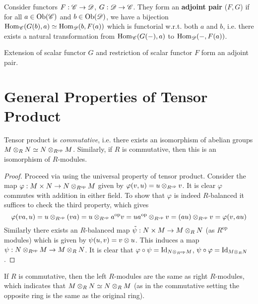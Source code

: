 \begin{definition}
    Consider functors $F: \mathscr{C} \to \mathscr{D}$, $G: \mathscr{D} \to \mathscr{C}$. They form an \textbf{adjoint pair} ($F, G$) if for all $a \in \mathrm{Ob}(\mathscr{C})$ and $b \in \mathrm{Ob}(\mathscr{D})$, we have a bijection $\mathrm{Hom}_{\mathscr{C}}(G(b), a) \simeq \mathrm{Hom}_{\mathscr{D}}(b, F(a))$ which is functorial w.r.t. both $a$ and $b$, i.e. there exists a natural transformation from $\mathrm{Hom}_{\mathscr{C}}(G(-), a)$ to $\mathrm{Hom}_{\mathscr{D}}(-, F(a))$.
\end{definition}

\begin{remark}
    Extension of scalar functor $G$ and restriction of scalar functor $F$ form an adjoint pair.
\end{remark}

\section{General Properties of Tensor Product}

\def\op{\text{op}}

\begin{proposition}
    Tensor product is \emph{commutative}, i.e. there exists an isomorphism of abelian groups $M \tensor_R N \simeq N \tensor_{R^{\op}} M$. Similarly, if $R$ is commutative, then this is an isomorphism of $R$-modules.
\end{proposition}

\begin{proof}
    Proceed via using the universal property of tensor product. Consider the map $\varphi: M \times N \to N \tensor_{R^{\op}} M$ given by $\varphi(v, u) = u \tensor_{R^{\op}} v$. It is clear $\varphi$ commutes with addition in either field. To show that $\varphi$ is indeed $R$-balanced it suffices to check the third property, which gives 
    \[
        \varphi(va, u) = u \tensor_{R^{\op}} (va) = u \tensor_{R^\op} a^\op v = u a^\op \tensor_{R^\op} v =(au) \tensor_{R^\op} v = \varphi(v, au)
    \]
    Similarly there exists an $R$-balanced map $\tilde{\psi}: N \times M \to M \otimes_R N$ (as $R^\op$ modules) which is given by $\psi(u, v) = v \otimes u$. This induces a map $\psi: N \tensor_{R^\op} M \to M \tensor_R N$. It is clear that $\varphi \circ \psi = \Id_{N \tensor_{R^\op} M}$, $\psi \circ \varphi = \mathrm{Id}_{M \otimes_R N}$. 
\end{proof}

\begin{remark}
    If $R$ is commutative, then the left $R$-modules are the same as right $R$-modules, which indicates that $M \otimes_R N \simeq N \otimes_R M$ (as in the commutative setting the opposite ring is the same as the original ring).
\end{remark}

